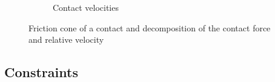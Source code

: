 \begin{figure}[htp]
\begin{subfigure}[b]{0.47\textwidth}
	\caption{Contact velocities}
	\label{fig:friction_cube}
\end{subfigure}
\caption[Friction cone and relative velocities]{Friction cone of a contact and decomposition of the contact force and relative velocity}
\label{fig:ph}
\end{figure}

\subsection{Constraints}
